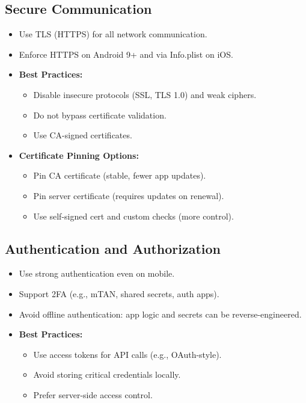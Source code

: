 \subsection{Secure Communication}
{
\begin{itemize}[noitemsep]
  \item Use TLS (HTTPS) for all network communication.
  \item Enforce HTTPS on Android 9+ and via Info.plist on iOS.
  \item \textbf{Best Practices:}
    \begin{itemize}[noitemsep]
      \item Disable insecure protocols (SSL, TLS 1.0) and weak ciphers.
      \item Do not bypass certificate validation.
      \item Use CA-signed certificates.
    \end{itemize}
  \item \textbf{Certificate Pinning Options:}
    \begin{itemize}[noitemsep]
      \item Pin CA certificate (stable, fewer app updates).
      \item Pin server certificate (requires updates on renewal).
      \item Use self-signed cert and custom checks (more control).
    \end{itemize}
\end{itemize}
}

\subsection{Authentication and Authorization}
{
\begin{itemize}[noitemsep]
  \item Use strong authentication even on mobile.
  \item Support 2FA (e.g., mTAN, shared secrets, auth apps).
  \item Avoid offline authentication: app logic and secrets can be reverse-engineered.
  \item \textbf{Best Practices:}
    \begin{itemize}[noitemsep]
      \item Use access tokens for API calls (e.g., OAuth-style).
      \item Avoid storing critical credentials locally.
      \item Prefer server-side access control.
    \end{itemize}
\end{itemize}}


